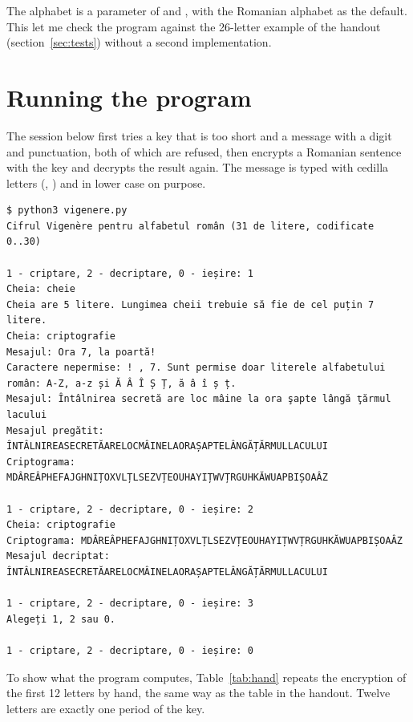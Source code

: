 \documentclass[11pt,a4paper]{article}
\begin{document}
The alphabet is a parameter of  and , with the Romanian alphabet as the
default. This let me check the program against the 26-letter example of the handout
(section~\ref{sec:tests}) without a second implementation.



\section{Running the program}

The session below first tries a key that is too short and a message with a digit and punctuation,
both of which are refused, then encrypts a Romanian sentence with the key  and
decrypts the result again. The message is typed with cedilla letters (, ) and in
lower case on purpose.

\begin{lstlisting}[caption={A session with the program},label={fig:run}]
$ python3 vigenere.py
Cifrul Vigenère pentru alfabetul român (31 de litere, codificate 0..30)

1 - criptare, 2 - decriptare, 0 - ieșire: 1
Cheia: cheie
Cheia are 5 litere. Lungimea cheii trebuie să fie de cel puțin 7 litere.
Cheia: criptografie
Mesajul: Ora 7, la poartă!
Caractere nepermise: ! , 7. Sunt permise doar literele alfabetului român: A-Z, a-z și Ă Â Î Ș Ț, ă â î ș ț.
Mesajul: Întâlnirea secretă are loc mâine la ora şapte lângă ţărmul lacului
Mesajul pregătit: ÎNTÂLNIREASECRETĂARELOCMÂINELAORAȘAPTELÂNGĂȚĂRMULLACULUI
Criptograma:      MDÂREÂPHEFAJGHNIȚOXVLȚLSEZVȚEOUHAYIȚWVȚRGUHKĂWUAPBIȘOAÂZ

1 - criptare, 2 - decriptare, 0 - ieșire: 2
Cheia: criptografie
Criptograma: MDÂREÂPHEFAJGHNIȚOXVLȚLSEZVȚEOUHAYIȚWVȚRGUHKĂWUAPBIȘOAÂZ
Mesajul decriptat: ÎNTÂLNIREASECRETĂARELOCMÂINELAORAȘAPTELÂNGĂȚĂRMULLACULUI

1 - criptare, 2 - decriptare, 0 - ieșire: 3
Alegeți 1, 2 sau 0.

1 - criptare, 2 - decriptare, 0 - ieșire: 0
\end{lstlisting}

To show what the program computes, Table~\ref{tab:hand} repeats the encryption of the first 12
letters by hand, the same way as the table in the handout. Twelve letters are exactly one period
of the key.
\end{document}
